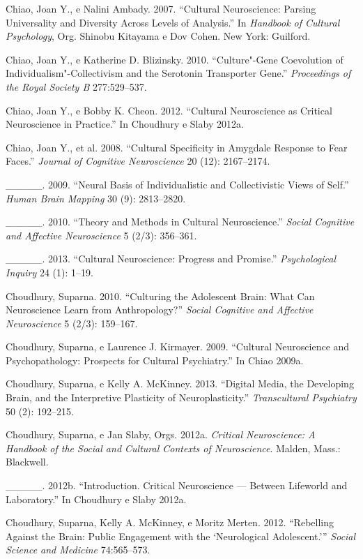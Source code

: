{\begin{Parskip}
Chiao, Joan Y., e Nalini Ambady. 2007. ``Cultural Neuroscience: Parsing
Universality and Diversity Across Levels of Analysis.'' In
\emph{Handbook of Cultural Psychology}, Org. Shinobu Kitayama e Dov
Cohen. New York: Guilford.

Chiao, Joan Y., e Katherine D. Blizinsky. 2010. ``Culture"-Gene
Coevolution of Individualism"-Collectivism and the Serotonin Transporter
Gene.'' \emph{Proceedings of the Royal Society B} 277:529--537.

Chiao, Joan Y., e Bobby K. Cheon. 2012. ``Cultural Neuroscience as
Critical Neuroscience in Practice.'' In Choudhury e Slaby 2012a.

Chiao, Joan Y., et al. 2008. ``Cultural Specificity in Amygdale Response
to Fear Faces.'' \emph{Journal of Cognitive Neuroscience} 20 (12):
2167--2174.

\_\_\_\_\_. 2009. ``Neural Basis of Individualistic and Collectivistic
Views of Self.'' \emph{Human Brain Mapping} 30 (9): 2813--2820.

\_\_\_\_\_. 2010. ``Theory and Methods in Cultural Neuroscience.''
\emph{Social Cognitive and Affective Neuroscience} 5 (2/3): 356--361.

\_\_\_\_\_. 2013. ``Cultural Neuroscience: Progress and Promise.''
\emph{Psychological Inquiry} 24 (1): 1--19.

Choudhury, Suparna. 2010. ``Culturing the Adolescent Brain: What Can
Neuroscience Learn from Anthropology?'' \emph{Social Cognitive and
Affective Neuroscience} 5 (2/3): 159--167.

Choudhury, Suparna, e Laurence J. Kirmayer. 2009. ``Cultural
Neuroscience and Psychopathology: Prospects for Cultural Psychiatry.''
In Chiao 2009a.

Choudhury, Suparna, e Kelly A. McKinney. 2013. ``Digital Media, the
Developing Brain, and the Interpretive Plasticity of Neuroplasticity.''
\emph{Transcultural Psychiatry} 50 (2): 192--215.

Choudhury, Suparna, e Jan Slaby, Orgs. 2012a. \emph{Critical
Neuroscience: A Handbook of the Social and Cultural Contexts of
Neuroscience}. Malden, Mass.: Blackwell.

\_\_\_\_\_. 2012b. ``Introduction. Critical Neuroscience --- Between
Lifeworld and Laboratory.'' In Choudhury e Slaby 2012a.

Choudhury, Suparna, Kelly A. McKinney, e Moritz Merten. 2012.
``Rebelling Against the Brain: Public Engagement with the `Neurological
Adolescent.''' \emph{Social Science and Medicine} 74:565--573.


\end{Parskip}}
